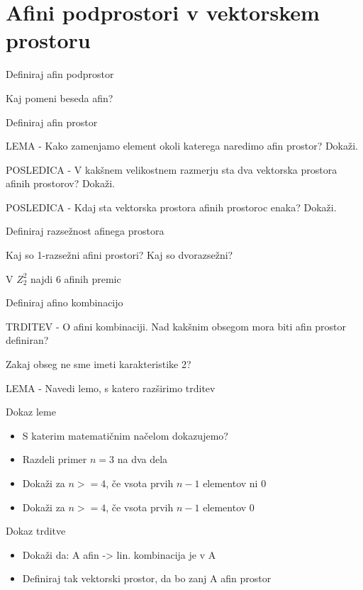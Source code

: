 \documentclass{article}
\begin{document}
    \section{Afini podprostori v vektorskem prostoru}
    \begin{enumerate}
        {\color{red}\item Definiraj afin podprostor}
        \item Kaj pomeni beseda afin?
        \item Definiraj afin prostor
        \item LEMA - Kako zamenjamo element okoli katerega naredimo afin prostor? Dokaži.
        {\color{red}\item POSLEDICA - V kakšnem velikostnem razmerju sta dva vektorska prostora afinih prostorov? Dokaži.}
        \item POSLEDICA - Kdaj sta vektorska prostora afinih prostoroc enaka? Dokaži.
        \item Definiraj razsežnost afinega prostora
        \item Kaj so 1-razsežni afini prostori? Kaj so dvorazsežni?
        \item V $Z_2^2$ najdi 6 afinih premic
        \item Definiraj afino kombinacijo
        \item TRDITEV - O afini kombinaciji. Nad kakšnim obsegom mora biti afin prostor definiran?
        {\color{red}\item Zakaj obseg ne sme imeti karakteristike 2?}
        \item LEMA - Navedi lemo, s katero razširimo trditev
        \item Dokaz leme
        \begin{itemize}
            \item S katerim matematičnim načelom dokazujemo?
            \item Razdeli primer $n = 3$ na dva dela
            \item Dokaži za $n >= 4$, če vsota prvih $n - 1$ elementov ni 0
            \item Dokaži za $n >= 4$, če vsota prvih $n - 1$ elementov 0
        \end{itemize}
        \item Dokaz trditve
        \begin{itemize}
            \item Dokaži da: A afin -> lin. kombinacija je v A
            \item Definiraj tak vektorski prostor, da bo zanj A afin prostor

\end{itemize}
\end{enumerate}
\end{document}
